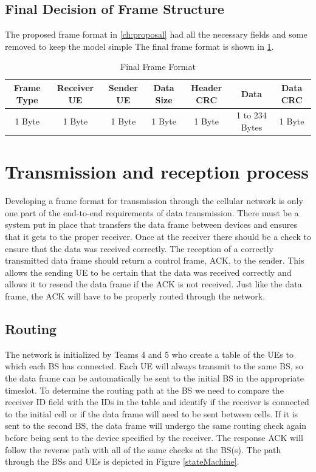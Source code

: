 \subsection{Final Decision of Frame Structure}



The proposed frame format in \ref{ch:proposal} had all the necessary fields and some removed to keep the model simple
The final frame format is  shown in \ref{tab:finalFrame}.

\begin{table}
\begin{center}
\begin{tabular}{| c | c | c | c | c | c | c | }
  \hline                       
  Frame Type & Receiver UE & Sender UE & Data Size & Header CRC & Data & Data CRC\\
  \hline
	1 Byte & 1 Byte & 1 Byte & 1 Byte & 1 Byte & 1 to 234 Bytes & 1 Byte\\
  
  \hline  
\end{tabular}
\end{center}
 \caption{Final Frame Format}
	\label{tab:finalFrame}
\end{table}

\section{Transmission and reception process}

Developing a frame format for transmission through the cellular network is only one part of the end-to-end requirements of data transmission. There must be a system put in place that transfers the data frame between devices and ensures that it gets to the proper receiver. Once at the receiver there should be a check to ensure that the data was received correctly. The reception of a correctly transmitted data frame should return a control frame, ACK, to the sender.  This allows the sending UE to be certain that the data was received correctly and allows it to resend the data frame if the ACK is not received. Just like the data frame, the ACK will have to be properly routed through the network. 

\subsection {Routing}

The network is initialized by Teams 4 and 5 who create a table of the UEs to which each BS has connected. Each UE will always transmit to the same BS, so the data frame can be automatically be sent to the initial BS in the appropriate timeslot.  To determine the routing path at the BS we need to compare the receiver ID field with the IDs in the table and identify if the receiver is connected to the initial cell or if the data frame will need to be sent between cells. If it is sent to the second BS, the data frame will undergo the same routing check again before being sent to the device specified by the receiver. The response ACK will follow the reverse path with all of the same checks at the BS(s). The path through the BSs and UEs is depicted in Figure \ref{stateMachine}.

